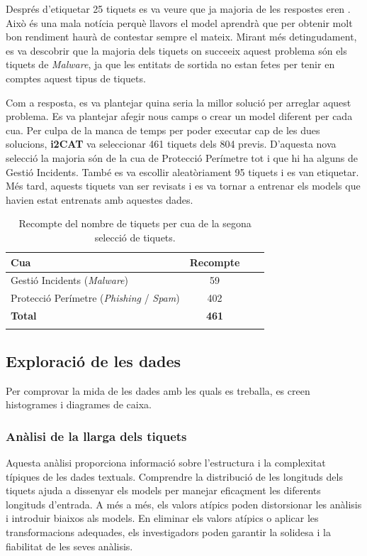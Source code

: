 Després d'etiquetar 25 tiquets es va veure que ja majoria de les respostes eren . Això és una mala notícia perquè llavors el model aprendrà que per obtenir molt bon rendiment haurà de contestar sempre el mateix. Mirant més detingudament, es va descobrir que la majoria dels tiquets on succeeix aquest problema són els tiquets de \textit{Malware}, ja que les entitats de sortida no estan fetes per tenir en comptes aquest tipus de tiquets.

Com a resposta, es va plantejar quina seria la millor solució per arreglar aquest problema. Es va plantejar afegir nous camps o crear un model diferent per cada cua. Per culpa de la manca de temps per poder executar cap de les dues solucions, \textbf{i2CAT} va seleccionar 461 tiquets dels 804 previs. D'aquesta nova selecció la majoria són de la cua de Protecció Perímetre tot i que hi ha alguns de Gestió Incidents. També es va escollir aleatòriament 95 tiquets i es van etiquetar. Més tard, aquests tiquets van ser revisats i es va tornar a entrenar els models que havien estat entrenats amb aquestes dades.

\begin{table}[H]
  \centering
  \begin{tabular}{lccr}
      \Xhline{2\arrayrulewidth}
      \textbf{Cua} & \textbf{Recompte} \\
      \hline
      Gestió Incidents (\textit{Malware}) & 59 \\
      Protecció Perímetre (\textit{Phishing} / \textit{Spam}) & 402  \\
      \hline
      \textbf{Total} & \textbf{461} \\
      \Xhline{2\arrayrulewidth}
  \end{tabular}
  \caption{Recompte del nombre de tiquets per cua de la segona selecció de tiquets.}
  \label{tab:recompte_per_cua_2}
\end{table}





\subsection{Exploració de les dades}
Per comprovar la mida de les dades amb les quals es treballa, es creen histogrames i diagrames de caixa.

\subsubsection{Anàlisi de la llarga dels tiquets}
Aquesta anàlisi proporciona informació sobre l'estructura i la complexitat típiques de les dades textuals. Comprendre la distribució de les longituds dels tiquets ajuda a dissenyar els models per manejar eficaçment les diferents longituds d'entrada. A més a més, els valors atípics poden distorsionar les anàlisis i introduir biaixos als models. En eliminar els valors atípics o aplicar les transformacions adequades, els investigadors poden garantir la solidesa i la fiabilitat de les seves anàlisis.

